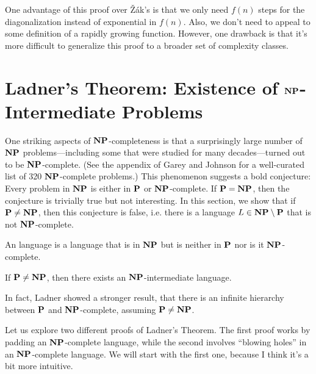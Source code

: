 \documentclass[11pt,twoside=off,numbers=noenddot]{scrbook}
\begin{document}
\begin{remark}
  One advantage of this proof over Žák's is that we only need $f(n)$ steps for the diagonalization instead of exponential in $f(n)$. Also, we don't need to appeal to some definition of a rapidly growing function. However, one drawback is that it's more difficult to generalize this proof to a broader set of complexity classes.
\end{remark}

\section{Ladner's Theorem: Existence of $\textbf{NP}$-Intermediate Problems}
One striking aspects of $\textbf{NP}$-completeness is that a surprisingly large number of $\textbf{NP}$ problems—including some that were studied for many decades—turned out to be $\textbf{NP}$-complete. (See the appendix of Garey and Johnson \cite{garey1979computers} for a well-curated list of 320 $\textbf{NP}$-complete problems.) This phenomenon suggests a bold conjecture: Every problem in $\textbf{NP}$ is either in $\textbf{P}$ or $\textbf{NP}$-complete. If $\textbf{P} = \textbf{NP}$, then the conjecture is trivially true but not interesting. In this section, we show that if $\textbf{P} \neq \textbf{NP}$, then this conjecture is false, i.e. there is a language $L \in \textbf{NP} \setminus \textbf{P}$ that is not $\textbf{NP}$-complete.

\begin{definition}
  An  language is a language that is in $\textbf{NP}$ but is neither in $\textbf{P}$ nor is it $\textbf{NP}$-complete.
\end{definition}

\begin{theorem}
  If $\textbf{P} \neq \textbf{NP}$, then there exists an $\textbf{NP}$-intermediate language.
\end{theorem}

\begin{remark}
  In fact, Ladner \cite{ladner1975structure} showed a stronger result, that there is an infinite hierarchy between $\textbf{P}$ and $\textbf{NP}$-complete, assuming $\textbf{P} \neq \textbf{NP}$.
\end{remark}

Let us explore two different proofs of Ladner's Theorem. The first proof works by padding an $\textbf{NP}$-complete language, while the second involves ``blowing holes'' in an $\textbf{NP}$-complete language. We will start with the first one, because I think it's a bit more intuitive.
\end{document}
